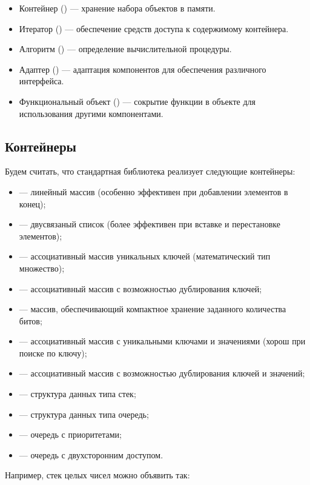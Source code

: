 \begin{itemize}
\item Контейнер () --- хранение набора объектов в памяти.
\item Итератор () --- обеспечение средств доступа к содержимому контейнера.
\item Алгоритм () --- определение вычислительной процедуры.
\item Адаптер () --- адаптация компонентов для обеспечения различного интерфейса.
\item Функциональный объект () --- сокрытие функции в объекте для использования другими
компонентами.
\end{itemize}

\subsection[Контейнеры]{Контейнеры}
Будем считать, что стандартная библиотека реализует следующие контейнеры:

\begin{itemize}
\item {} --- линейный массив (особенно эффективен при добавлении элементов в конец);
\item {} --- двусвязаный список (более эффективен при вставке и перестановке элементов);
\item {} --- ассоциативный массив уникальных ключей (математический тип множество);
\item {} --- ассоциативный массив с возможностью дублирования ключей;
\item {} --- массив, обеспечивающий компактное хранение заданного количества битов;
\item {} --- ассоциативный массив с уникальными ключами и значениями (хорош при поиске по ключу);
\item {} --- ассоциативный массив с возможностью дублирования ключей и значений;
\item {} --- структура данных типа стек;
\item {} --- структура данных типа очередь;
\item {} --- очередь с приоритетами;
\item {} --- очередь с двухсторонним доступом.
\end{itemize}
Например, стек целых чисел можно объявить так:

